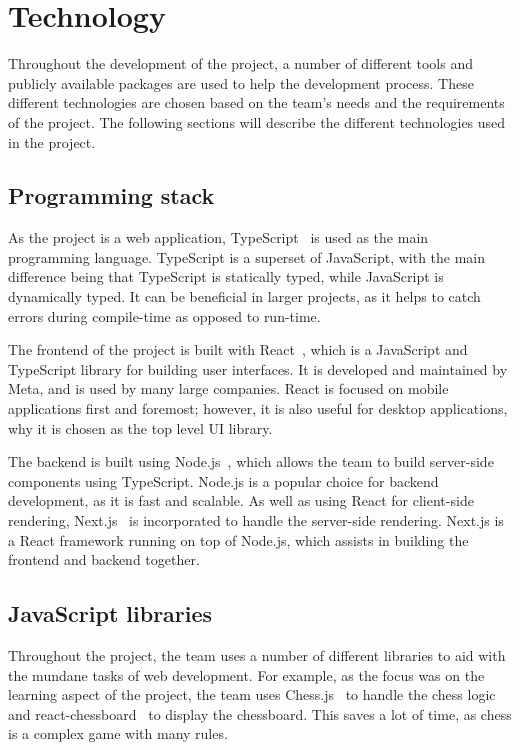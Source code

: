 \section{Technology}\label{sec:technology}

Throughout the development of the project, a number of different tools and publicly available packages are used to
help the development process.
These different technologies are chosen based on the team's needs and the requirements of the project.
The following sections will describe the different technologies used in the project.

\subsection{Programming stack}\label{subsec:programming}

As the project is a web application, TypeScript~\cite{typescript} is used as the main programming language.
TypeScript is a superset of JavaScript, with the main difference being that TypeScript is statically typed, while
JavaScript is dynamically typed.
It can be beneficial in larger projects, as it helps to catch errors during compile-time as opposed to run-time.

The frontend of the project is built with React~\cite{react}, which is a JavaScript and TypeScript library for building
user interfaces.
It is developed and maintained by Meta, and is used by many large companies.
React is focused on mobile applications first and foremost; however, it is also useful for desktop applications, why it
is chosen as the top level UI library.

The backend is built using Node.js~\cite{node.js}, which allows the team to build server-side components using
TypeScript.
Node.js is a popular choice for backend development, as it is fast and scalable.
As well as using React for client-side rendering, Next.js~\cite{next.js} is incorporated to handle the server-side
rendering.
Next.js is a React framework running on top of Node.js, which assists in building the frontend and backend
together.

\subsection{JavaScript libraries}\label{subsec:libraries}

Throughout the project, the team uses a number of different libraries to aid with the mundane tasks of web development.
For example, as the focus was on the learning aspect of the project, the team uses Chess.js~\cite{chess.js} to handle
the chess logic and react-chessboard~\cite{react-chessboard} to display the chessboard.
This saves a lot of time, as chess is a complex game with many rules.

